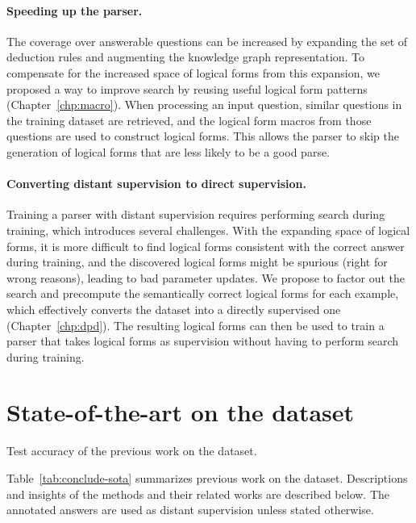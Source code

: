 \paragraph{Speeding up the parser.}
The coverage over answerable questions can be increased
by expanding the set of deduction rules
and augmenting the knowledge graph representation.
To compensate for the increased space of logical forms
from this expansion,
we proposed a way to improve search
by reusing useful logical form patterns
(Chapter~\ref{chp:macro}).
When processing an input question,
similar questions in the training dataset are retrieved,
and the logical form macros from those questions
are used to construct logical forms.
This allows the parser to skip the generation of
logical forms that are less likely to be a good parse.

\paragraph{Converting distant supervision to direct supervision.}
Training a parser with distant supervision requires
performing search during training,
which introduces several challenges.
With the expanding space of logical forms,
it is more difficult to find logical forms consistent
with the correct answer during training,
and the discovered logical forms might be spurious
(right for wrong reasons),
leading to bad parameter updates.
We propose to factor out the search
and precompute the semantically correct logical forms
for each example,
which effectively converts the dataset into
a directly supervised one (Chapter~\ref{chp:dpd}).
The resulting logical forms
can then be used to train a parser
that takes logical forms as supervision
without having to perform search during training.

\section{State-of-the-art on the \wtq dataset}

\begin{table}[t]
\centering

\caption{Test accuracy of the previous work
on the \wtq dataset.}
\label{tab:conclude-sota}
\end{table}

Table~\ref{tab:conclude-sota}
summarizes previous work on the \wtq dataset.
Descriptions and insights of the methods and their related works
are described below.
The annotated answers are used as distant supervision
unless stated otherwise.

